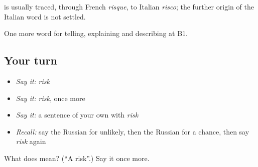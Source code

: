 \begin{cousinweb}
\textbf{} is usually traced, through French \emph{risque}, to Italian \emph{risco}; the further origin of the Italian word is not settled.
\end{cousinweb}

\begin{grammarlens}[title={What you've built}]
One more word for telling, explaining and describing at B1.
\end{grammarlens}

\subsection*{Your turn}
\begin{itemize}
\raggedright
  \item \emph{Say it:} \emph{risk}
  \item \emph{Say it:} \emph{risk}, once more
  \item \emph{Say it:} a sentence of your own with \emph{risk}
  \item \emph{Recall:} say the Russian for unlikely, then the Russian for a chance, then say \emph{risk} again
\end{itemize}

\begin{tcolorbox}[breakable,colback=teal!4,colframe=teal!35!black,title={Before you move on}]
What does  mean? (\textquotedblleft{}A risk\textquotedblright{}.) Say it once more.
\end{tcolorbox}
